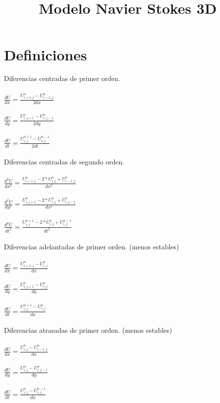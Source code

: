 \documentclass[a4paper]{article}
\title{Modelo Navier Stokes 3D}
\author{}
\begin{document}
\maketitle
\section{Definiciones}
Diferencias centradas de primer orden.
\\
\\
$\frac{dU}{dx} = \frac{U^{n}_{i+1,j} - U^{n}_{i-1,j}}{2dx} $
\\
\\
$\frac{dU}{dy} = \frac{U^{n}_{i,j+1} - U^{n}_{i,j-1}}{2dy} $
\\
\\
$\frac{dU}{dt} = \frac{U^{n+1}_{i,j} - U^{n-1}_{i,j}}{2dt} $
\\
\\
Diferencias centradas de segundo orden.
\\
\\
$\frac{d^{2}U}{dx^{2}} = \frac{ U^{n}_{i+1,j} - 2*U^{n}_{i,j} + U^{n}_{i-1,j}}{dx^2}$
\\
\\
$\frac{d^{2}U}{dy^{2}} = \frac{ U^{n}_{i,j+1} - 2*U^{n}_{i,j} + U^{n}_{i,j-1}}{dx^2}$
\\
\\
$\frac{d^{2}U}{dt^{2}} = \frac{ U^{n+1}_{i,j} - 2*U^{n}_{i,j} + U^{n-1}_{i,j}}{dt^2}$
\\
\\

Diferencias adelantadas de primer orden. (menos estables)
\\
\\
$\frac{dU}{dx} = \frac{U^{n}_{i+1,j} - U^{n}_{i,j}}{dx} $
\\
\\
$\frac{dU}{dy} = \frac{U^{n}_{i,j+1} - U^{n}_{i,j}}{dy} $
\\
\\
$\frac{dU}{dt} = \frac{U^{n+1}_{i,j} - U^{n}_{i,j}}{dx} $
\\
\\

Diferencias atrasadas de primer orden. (menos estables)
\\
\\
$\frac{dU}{dx} = \frac{U^{n}_{i,j} - U^{n}_{i-1,j}}{dx} $
\\
\\
$\frac{dU}{dy} = \frac{U^{n}_{i,j} - U^{n}_{i,j-1}}{dy} $
\\
\\
$\frac{dU}{dt} = \frac{U^{n}_{i,j} - U^{n-1}_{i,j}}{dx} $
\\
\\
\end{document}
